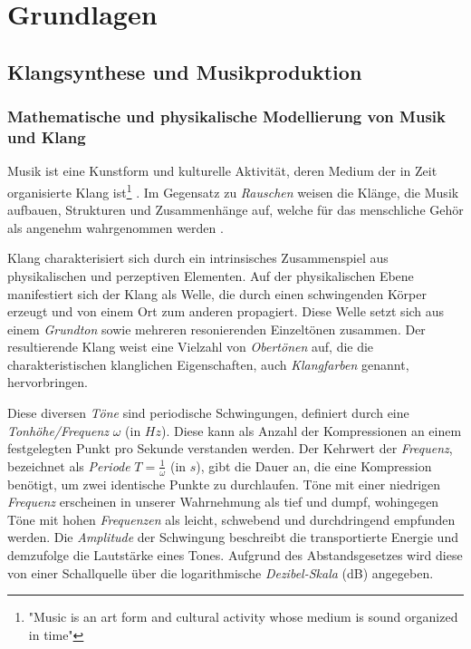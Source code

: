 \documentclass[
  a4paper,  %
  twoside,  %
  bibliography=totoc,
  headsepline,
  cleardoublepage=empty,
  parskip=half,
  draft=false
]{scrbook}
\begin{document}
\chapter{Grundlagen}

\section{Klangsynthese und Musikproduktion}

\subsection{Mathematische und physikalische Modellierung von Musik und Klang}\label{sec:music_math}
\glqq Musik ist eine Kunstform und kulturelle Aktivität, deren Medium der in Zeit organisierte Klang ist\grqq \footnote{"Music is an art form and cultural activity whose medium is sound organized in time"} \cite{tsuji_physics_2021}. Im Gegensatz zu \emph{Rauschen} weisen die Klänge, die Musik aufbauen, Strukturen und Zusammenhänge auf, welche für das menschliche Gehör als angenehm wahrgenommen werden \cite{parker_good_2009}. 

Klang charakterisiert sich durch ein intrinsisches Zusammenspiel aus physikalischen und perzeptiven Elementen. Auf der physikalischen Ebene manifestiert sich der Klang als Welle, die durch einen schwingenden Körper erzeugt und von einem Ort zum anderen propagiert. Diese Welle setzt sich aus einem \emph{Grundton} sowie mehreren resonierenden Einzeltönen zusammen. Der resultierende Klang weist eine Vielzahl von \emph{Obertönen} auf, die die charakteristischen klanglichen Eigenschaften, auch \emph{Klangfarben} genannt, hervorbringen. \cite{tsuji_physics_2021, parker_good_2009}

Diese diversen \emph{Töne} sind periodische Schwingungen, definiert durch eine \emph{Tonhöhe/Frequenz} $\omega$ (in $Hz$). Diese kann als Anzahl der Kompressionen an einem festgelegten Punkt pro Sekunde verstanden werden. Der Kehrwert der \emph{Frequenz}, bezeichnet als \emph{Periode} $T=\frac{1}{\omega}$ (in $s$), gibt die Dauer an, die eine Kompression benötigt, um zwei identische Punkte zu durchlaufen. Töne mit einer niedrigen \emph{Frequenz} erscheinen in unserer Wahrnehmung als tief und dumpf, wohingegen Töne mit hohen \emph{Frequenzen} als leicht, schwebend und durchdringend empfunden werden. Die \emph{Amplitude} der Schwingung beschreibt die transportierte Energie und demzufolge die Lautstärke eines Tones. Aufgrund des Abstandsgesetzes wird diese von einer Schallquelle über die logarithmische \emph{Dezibel-Skala} (dB) angegeben. \cite{tsuji_physics_2021, parker_good_2009}
\end{document}
